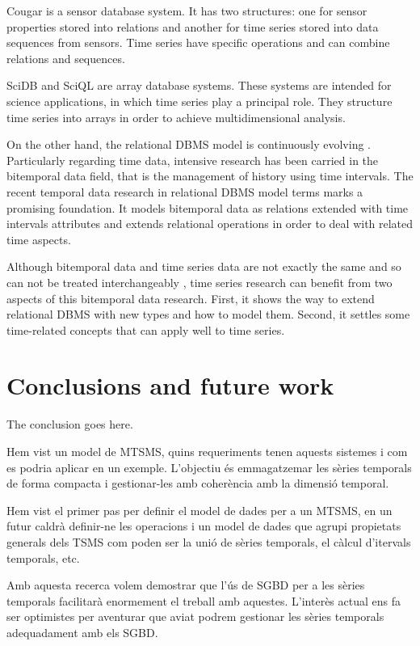 \documentclass{scrartcl}
\begin{document}
Cougar \cite{bonnet01} is a sensor database system. It has two
structures: one for sensor properties stored into relations and
another for time series stored into data sequences from sensors.  Time
series have specific operations and can combine relations and
sequences.


SciDB \cite{stonebraker09:scidb} and SciQL \cite{zhang11} are array
database systems. These systems are intended for science applications,
in which time series play a principal role. They structure time series
into arrays in order to achieve multidimensional analysis.



On the other hand, the relational DBMS model is continuously evolving
. Particularly regarding time data,
intensive research has been carried in the bitemporal data field, that
is the management of history using time intervals. 
The recent temporal data research in relational DBMS model terms
\cite{ddl02} marks a promising foundation. It models bitemporal data
as relations extended with time intervals attributes and extends
relational operations in order to deal with related time aspects.

Although bitemporal data and time series data are not exactly the same
and so can not be treated interchangeably ,
time series research can benefit from two aspects of this bitemporal
data research. First, it shows the way to extend relational DBMS with
new types and how to model them. Second, it settles some time-related
concepts that can apply well to time series.






\section{Conclusions and future work} 
The conclusion goes here.

Hem vist un model de MTSMS, quins requeriments tenen aquests sistemes i com es podria aplicar en un exemple. L'objectiu és emmagatzemar les sèries temporals de forma compacta i gestionar-les amb coherència amb la dimensió temporal. 

Hem vist el primer pas per definir el model de dades per a un MTSMS, en un futur caldrà definir-ne les operacions i un model de dades que agrupi propietats generals dels TSMS com poden ser la unió de sèries temporals, el càlcul d'itervals temporals, etc.

Amb aquesta recerca volem demostrar que l'ús de SGBD per a les sèries temporals facilitarà enormement el treball amb aquestes.
L'interès actual ens fa ser optimistes per aventurar que aviat podrem gestionar les sèries temporals adequadament amb els SGBD.
\end{document}
